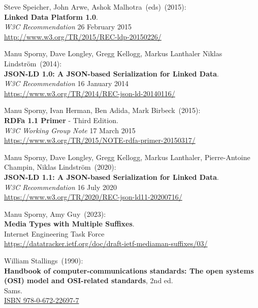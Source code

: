 \begin{thebibliography}{9}
Steve Speicher, John Arwe, Ashok Malhotra~(eds)~(2015): \\
\textbf{Linked Data Platform 1.0}.\\ 
\emph{W3C Recommendation} 26 February 2015\\
\url{http://www.w3.org/TR/2015/REC-ldp-20150226/}

Manu Sporny, Dave Longley,  Gregg Kellogg,  Markus Lanthaler
Niklas Lindström~(2014): \\
\textbf{JSON-LD 1.0: A JSON-based Serialization for Linked Data}.\\
\emph{W3C Recommendation} 16 January 2014\\
\url{https://www.w3.org/TR/2014/REC-json-ld-20140116/}

Manu Sporny, Ivan Herman, Ben Adida, Mark Birbeck~(2015): \\
\textbf{RDFa 1.1 Primer} - Third Edition. \\
\emph{W3C Working Group Note} 17 March 2015 \\
\url{https://www.w3.org/TR/2015/NOTE-rdfa-primer-20150317/}

Manu Sporny, Dave Longley, Gregg Kellogg, Markus Lanthaler, Pierre-Antoine Champin, Niklas Lindström~(2020): \\
\textbf{JSON-LD 1.1: A JSON-based Serialization for Linked Data}.\\
\emph{W3C Recommendation} 16 July 2020\\
\url{https://www.w3.org/TR/2020/REC-json-ld11-20200716/}

Manu Sporny, Amy Guy~(2023): \\
\textbf{{Media Types with Multiple Suffixes}}.\\
Internet Engineering Task Force\\
\url{https://datatracker.ietf.org/doc/draft-ietf-mediaman-suffixes/03/}
 
 William Stallings~(1990): \\
\textbf{Handbook of computer-communications standards: {The} open systems ({OSI}) model and {OSI-related} standards}, 2nd ed. \\
Sams.\\
\href{https://identifiers.org/isbn/9780672226977}{ISBN 978-0-672-22697-7}
 

\end{thebibliography}
